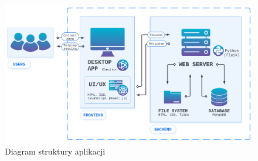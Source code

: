 \documentclass[12pt,a4paper,twoside]{article}
\begin{document}
\begin{figure}[h!]
\centering
\includegraphics[width=\textwidth]{img/archi2.pdf}
\caption{Diagram struktury aplikacji}
\end{figure}\par
\end{document}
